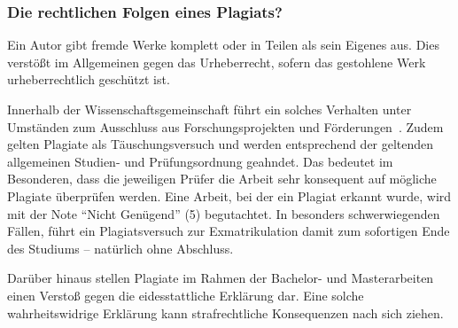\subsubsection{Die rechtlichen Folgen eines Plagiats?}\label{sec:citations:plagarism:law}
%
Ein Autor gibt fremde Werke komplett oder in Teilen als sein Eigenes aus. Dies verstößt im Allgemeinen gegen das Urheberrecht, sofern das gestohlene Werk urheberrechtlich geschützt ist. 

Innerhalb der Wissenschaftsgemeinschaft führt ein solches Verhalten unter Umständen zum Ausschluss aus Forschungsprojekten und Förderungen~\cite{dfg:2013:01}. Zudem gelten Plagiate als Täuschungsversuch und werden entsprechend der geltenden allgemeinen Studien- und Prüfungsordnung geahndet. Das bedeutet im Besonderen, dass die jeweiligen Prüfer die Arbeit sehr konsequent auf mögliche Plagiate überprüfen werden. Eine Arbeit, bei der ein Plagiat erkannt wurde, wird mit der Note \enquote{Nicht Genügend} (5) begutachtet. In besonders schwerwiegenden Fällen, führt ein Plagiatsversuch zur Exmatrikulation damit zum sofortigen Ende des Studiums – natürlich ohne Abschluss.

Darüber hinaus stellen Plagiate im Rahmen der Bachelor- und Masterarbeiten einen Verstoß
gegen die eidesstattliche Erklärung dar. Eine solche wahrheitswidrige Erklärung kann
strafrechtliche Konsequenzen nach sich ziehen.

